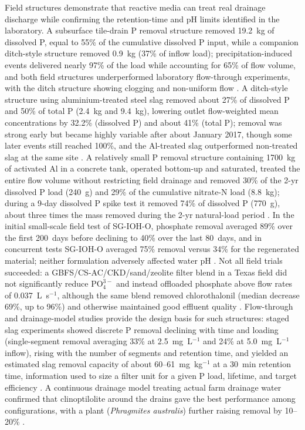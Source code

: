 Field structures demonstrate that reactive media can treat real drainage discharge
while confirming the retention-time and pH limits identified in the laboratory.
A subsurface tile-drain P removal structure removed 19.2~kg of dissolved P,
equal to 55\% of the cumulative dissolved P input, while a companion ditch-style
structure removed 0.9~kg (37\% of inflow load); precipitation-induced events
delivered nearly 97\% of the load while accounting for 65\% of flow volume, and
both field structures underperformed laboratory flow-through experiments, with the
ditch structure showing clogging and non-uniform flow \parencite{Penn2020}. A
ditch-style structure using aluminium-treated steel slag removed about 27\% of
dissolved P and 50\% of total P (2.4~kg and 9.4~kg), lowering outlet flow-weighted
mean concentrations by 32.2\% (dissolved P) and about 41\% (total P); removal was
strong early but became highly variable after about January 2017, though some
later events still reached 100\%, and the Al-treated slag outperformed
non-treated slag at the same site \parencite{Shedekar2020}. A relatively small P
removal structure containing 1700~kg of activated Al in a concrete tank, operated
bottom-up and saturated, treated the entire flow volume without restricting field
drainage and removed 30\% of the 2-yr dissolved P load (240~g) and 29\% of the
cumulative nitrate-N load (8.8~kg); during a 9-day dissolved P spike test it
removed 74\% of dissolved P (770~g), about three times the mass removed during the
2-yr natural-load period \parencite{Penn2024}. In the initial small-scale field
test of SG-IOH-O, phosphate removal averaged 89\% over the first 200~days before
declining to 40\% over the last 80~days, and in concurrent tests SG-IOH-O averaged
75\% removal versus 34\% for the regenerated material; neither formulation
adversely affected water pH \parencite{Allred2017}. Not all field trials succeeded:
a GBFS/CS-AC/CKD/sand/zeolite filter blend in a Texas field did not significantly
reduce $\mathrm{PO_4^{3-}}$ and instead offloaded phosphate above flow rates of
0.037~L~s$^{-1}$, although the same blend removed chlorothalonil (median decrease
69\%, up to 96\%) and otherwise maintained good effluent quality
\parencite{Agrawal2011b}. Flow-through and drainage-model studies provide the
design basis for such structures: staged slag experiments showed discrete P
removal declining with time and loading (single-segment removal averaging 33\% at
2.5~mg~L$^{-1}$ and 24\% at 5.0~mg~L$^{-1}$ inflow), rising with the number of
segments and retention time, and yielded an estimated slag removal capacity of
about 60--61~mg~kg$^{-1}$ at a 30~min retention time, information used to size a
filter unit for a given P load, lifetime, and target efficiency
\parencite{Wang2020d}. A continuous drainage model treating actual farm drainage
water confirmed that clinoptilolite around the drains gave the best performance
among configurations, with a plant (\textit{Phragmites australis}) further raising
removal by 10--20\% \parencite{Sadeghi2021}.

